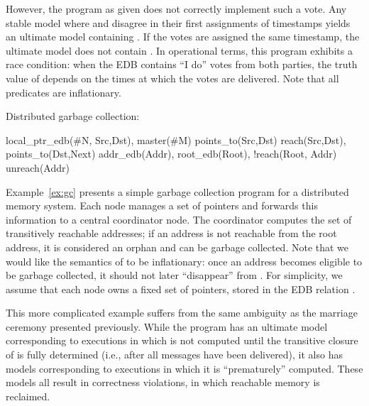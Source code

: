 However, the \lang program as given does not correctly implement such a vote.
Any stable model where  and 
disagree in their first assignments of timestamps yields an ultimate model
containing .  If the votes are assigned the same timestamp,
the ultimate model does not contain . In operational terms,
this program exhibits a race condition: when the EDB contains ``I do'' votes
from both parties, the truth value of  depends on the times
at which the votes are delivered. Note that all predicates are inflationary.

\begin{example}
\label{ex:gc}
Distributed garbage collection:

\begin{Drules}
        {local_ptr_edb(#N, Src,Dst), master(#M)}
        {points_to(Src,Dst)}
        {reach(Src,Dst), points_to(Dst,Next)}
        {addr_edb(Addr), root_edb(Root), !reach(Root, Addr)}
   {unreach(Addr)}
\end{Drules}
\end{example}
Example~\ref{ex:gc} presents a simple garbage collection program for a
distributed memory system. Each node manages a set of pointers and forwards this
information to a central coordinator node. The coordinator computes the set of
transitively reachable addresses; if an address is not reachable from the root
address, it is considered an orphan and can be garbage collected. Note that we
would like the semantics of  to be inflationary: once an
address becomes eligible to be garbage collected, it should not later
``disappear'' from . For simplicity, we assume that each node
owns a fixed set of pointers, stored in the EDB relation
.

This more complicated example suffers from the same ambiguity as the marriage
ceremony presented previously.  While the program has an ultimate model
corresponding to executions in which  is not computed until the
transitive closure of  is fully determined (i.e., after all
messages have been delivered), it also has models corresponding to executions in
which it is ``prematurely'' computed.  These models all result in correctness
violations, in which reachable memory is reclaimed.

